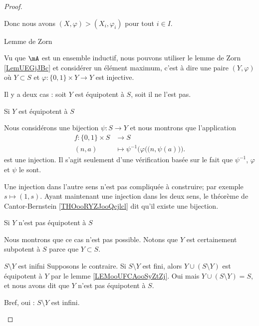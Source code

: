 \begin{proof}
\begin{subproof}
            Donc nous avons \( (X,\varphi)>(X_i,\varphi_i)\) pour tout \( i\in I\).

        \item[Lemme de Zorn]

            Vu que \( \mA\) est un ensemble inductif, nous pouvons utiliser le lemme de Zorn \ref{LemUEGjJBc} et considérer un élément maximum, c'est à dire une paire \( (Y,\varphi)\) où \( Y\subset S\) et \( \varphi\colon \{ 0,1 \}\times Y\to Y\) est injective.

            Il y a deux cas : soit \( Y\) est équipotent à \( S\), soit il ne l'est pas.

        \item[Si \( Y\) est équipotent à \( S\)]

            Nous considérons une bijection \( \psi\colon S\to Y\) et nous montrons que l'application
            \begin{equation}
                \begin{aligned}
                    f\colon \{ 0,1 \}\times S&\to S \\
                    (n,a)&\mapsto \psi^{-1}\Big( \varphi\big( (n,\psi(a)\big) \Big) .
                \end{aligned}
            \end{equation}
            est une injection. Il s'agit seulement d'une vérification basée sur le fait que \( \psi^{-1}\), \( \varphi\) et \( \psi\) le sont.

            Une injection dans l'autre sens n'est pas compliquée à construire; par exemple \( s\mapsto (1,s)\). Ayant maintenant une injection dans les deux sens, le théorème de Cantor-Bernstein \ref{THOooRYZJooQcjlcl} dit qu'il existe une bijection.

        \item[Si \( Y\) n'est pas équipotent à \( S\)]

            Nous montrons que ce cas n'est pas possible. Notons que \( Y\) est certainement subpotent à \( S\) parce que \( Y\subset S\).
            \begin{subproof}
                \item[\( S\setminus Y\) est inifni]
                    Supposons le contraire. Si \( S\setminus Y\) est fini, alors \( Y\cup(S\setminus Y)\) est équipotent à \( Y\) par le lemme \ref{LEMooUFCAooSyZtZj}. Oui mais \( Y\cup(S\setminus Y)=S\), et nous avons dit que \( Y\) n'est pas équipotent à \( S\).

                    Bref, oui : \( S\setminus Y\) est infini.


\end{subproof}
\end{subproof}
\end{proof}
